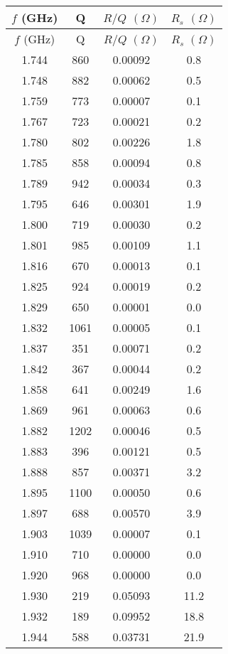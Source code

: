 \begin{longtable}{c | c | c | c} 
\endfirsthead$f$ (GHz) & Q & $R/Q$ $(\Omega)$ & $R_{s}$ $(\Omega)$ \\
              \endhead$f$ (GHz) & Q & $R/Q$ $(\Omega)$ & $R_{s}$ $(\Omega)$ \\ \hline 
1.744 &  860 & 0.00092 &  0.8 \\ \hline 
1.748 &  882 & 0.00062 &  0.5 \\ \hline 
1.759 &  773 & 0.00007 &  0.1 \\ \hline 
1.767 &  723 & 0.00021 &  0.2 \\ \hline 
1.780 &  802 & 0.00226 &  1.8 \\ \hline 
1.785 &  858 & 0.00094 &  0.8 \\ \hline 
1.789 &  942 & 0.00034 &  0.3 \\ \hline 
1.795 &  646 & 0.00301 &  1.9 \\ \hline 
1.800 &  719 & 0.00030 &  0.2 \\ \hline 
1.801 &  985 & 0.00109 &  1.1 \\ \hline 
1.816 &  670 & 0.00013 &  0.1 \\ \hline 
1.825 &  924 & 0.00019 &  0.2 \\ \hline 
1.829 &  650 & 0.00001 &  0.0 \\ \hline 
1.832 & 1061 & 0.00005 &  0.1 \\ \hline 
1.837 &  351 & 0.00071 &  0.2 \\ \hline 
1.842 &  367 & 0.00044 &  0.2 \\ \hline 
1.858 &  641 & 0.00249 &  1.6 \\ \hline 
1.869 &  961 & 0.00063 &  0.6 \\ \hline 
1.882 & 1202 & 0.00046 &  0.5 \\ \hline 
1.883 &  396 & 0.00121 &  0.5 \\ \hline 
1.888 &  857 & 0.00371 &  3.2 \\ \hline 
1.895 & 1100 & 0.00050 &  0.6 \\ \hline 
1.897 &  688 & 0.00570 &  3.9 \\ \hline 
1.903 & 1039 & 0.00007 &  0.1 \\ \hline 
1.910 &  710 & 0.00000 &  0.0 \\ \hline 
1.920 &  968 & 0.00000 &  0.0 \\ \hline 
1.930 &  219 & 0.05093 & 11.2 \\ \hline 
1.932 &  189 & 0.09952 & 18.8 \\ \hline 
1.944 &  588 & 0.03731 & 21.9 \\ \hline 

\end{longtable}
